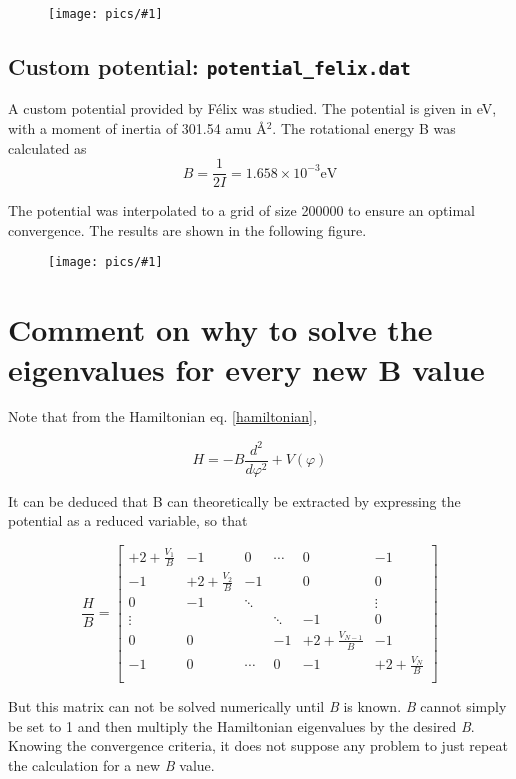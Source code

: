 \documentclass[12pt,a4paper]{article}
\newcommand{\NEWPICC}[2]{
\begin{figure}[H]
    \centering
    \texttt{[image: pics/\#1]}
    \label{#1}
    \end{figure}
    }
\begin{document}
\NEWPICC{interpolate_potential_HD.png}{1}


\subsection{Custom potential: \texttt{potential\_felix.dat}}


A custom potential provided by Félix was studied. The potential is given in eV, with a moment of inertia of 301.54 amu \AA$^2$. The rotational energy B was calculated as
$$
B = \frac{1}{2 I} = 1.658 \times 10^{-3} \text{eV}
$$

The potential was interpolated to a grid of size 200000 to ensure an optimal convergence. The results are shown in the following figure.

\NEWPICC{potential_felix.png}{1}


\section{Comment on why to solve the eigenvalues for every new B value}


Note that from the Hamiltonian eq. \eqref{hamiltonian},

\begin{equation*}
    H = -B \frac{d^2}{d\varphi^2} + V(\varphi)
\end{equation*}

It can be deduced that B can theoretically be extracted by expressing the potential as a reduced variable, so that

\[
    \frac{H}{B} =
    \left[ {\begin{array}{cccccc}
     +2 +\frac{V_1}{B}  &  -1                &  0     & \cdots &  0                     &  -1                \\
     -1                 & +2 +\frac{V_2}{B}  &  -1    &        &  0                     &  0                 \\
     0                  &  -1                & \ddots &        &                        &  \vdots            \\
     \vdots             &                    &        & \ddots &  -1                    &  0                 \\
     0                  &  0                 &        &  -1    & +2 +\frac{V_{N-1}}{B}  &  -1                \\
     -1                 &  0                 & \cdots &  0     &  -1                    & +2 +\frac{V_N}{B}  \\
    \end{array} } \right]
\]

But this matrix can not be solved numerically until \textit{B} is known.
\textit{B} cannot simply be set to 1 and then multiply the Hamiltonian eigenvalues by the desired \textit{B}.\\

Knowing the convergence criteria, it does not suppose any problem to just repeat the calculation for a new \textit{B} value.


\end{document}
